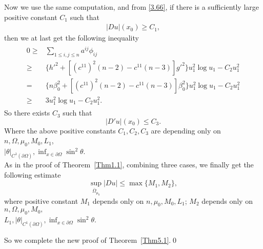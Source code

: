 \documentclass[11pt]{amsart}
\numberwithin{equation}{section}
\begin{document}
Now we use the same computation, and from \eqref{3.66}, if there is a sufficiently large positive constant $C_1$ such that
\begin{align}
|Du|(x_0) \ge C_1,\label{5.14g}
\end{align}
 then we  at last get the following inequality
\begin{align}\label{5.15}
\begin{split}
0\geq &\sum_{1\leq i,j\leq n}a^{ij}\phi_{ij}\\
\geq & \big\{h'^2+[(c^{11})^2(n-2)-c^{11}(n-3)]g'^2\big\}u_1^2\log u_1-C_2u_1^2\\
=& \big\{n\beta_0^2+[(c^{11})^2(n-2)-c^{11}(n-3)]\beta_0^2\big\}u_1^2\log u_1-C_2u_1^2\\
\geq & 3u_1^2\log u_1-C_2u_1^2.
\end{split}
\end{align}
 So there exists  $C_{3}$ such that  $$|D'u|(x_0)\leq C_{3}.$$
Where  the above positive constants $C_{1}, C_2, C_3$ are  depending only on $n, \Omega, \mu_0, M_0, L_1$, \\
$ |\theta|_{C^1(\partial\Omega)}, \inf_{x\in\partial\Omega}\sin^2\theta$.\\
As in the proof of Theorem~\ref{Thm1.1}, combining three cases, we finally get the following estimate
$$\sup_{\overline\Omega_{\mu_0}}|Du|\leq \max\{M_1, M_2\},$$
where positive constant $M_1$ depends only on $n, \mu_0, M_0, L_1$; $M_2$ depends only on $n, \Omega, \mu_0, M_0,$\\
$ L_1, |\theta|_{C^1(\partial\Omega)}, \inf_{x\in\partial\Omega}\sin^2\theta$.\par
So we complete the new proof of Theorem~\ref{Thm5.1}.\qed\\
\end{document}
